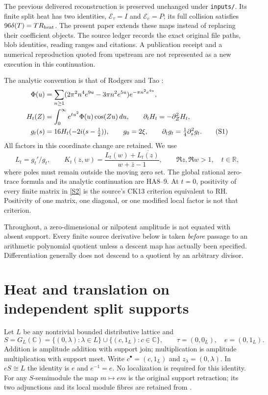 \documentclass[11pt,a4paper]{article}
\theoremstyle{definition}\newtheorem{definition}[theorem]{Definition}
\newcommand{\C}{\mathbb C}\newcommand{\R}{\mathbb R}\newcommand{\N}{\mathbb N}
\begin{document}
The previous delivered reconstruction \cite{Prior} is preserved unchanged under \texttt{inputs/}. Its finite split heat has two identities, $\mathcal E_\tau=I$ and $\mathcal E_e=P$; its full collision satisfies $96\delta(T)=TR_{\rm heat}$. The present paper extends these maps instead of replacing their coefficient objects. The source ledger records the exact original file paths, blob identities, reading ranges and citations. A publication receipt and a numerical reproduction quoted from upstream are not represented as a new execution in this continuation.

The analytic convention is that of Rodgers and Tao \cite{RT}:
\begin{align}
\Phi(u)&=\sum_{n\ge1}(2\pi^2n^4e^{9u}-3\pi n^2e^{5u})e^{-\pi n^2e^{4u}},\notag\\
H_t(Z)&=\int_0^\infty e^{tu^2}\Phi(u)\cos(Zu)\,du,\qquad
\partial_tH_t=-\partial_Z^2H_t,\notag\\
g_t(s)&=16H_t(-2i(s-\tfrac12)),\qquad g_0=2\xi,\qquad
\partial_tg_t=\tfrac14\partial_s^2g_t.\tag{S1}\label{S1}
\end{align}
All factors in this coordinate change are retained. We use
\begin{equation}
 L_t=g_t'/g_t,\qquad
 K_t(z,w)=\frac{L_t(w)+\overline{L_t(z)}}{w+\bar z-1},
 \qquad \Re z,\Re w>1,\quad t\in\R,                 \tag{S2}\label{S2}
\end{equation}
where poles must remain outside the moving zero set. The global rational zero-trace formula and its analytic continuation are HA8--9. At $t=0$, positivity of every finite matrix in \eqref{S2} is the source's CK13 criterion equivalent to RH. Positivity of one matrix, one diagonal, or one modified local factor is not that criterion.

Throughout, a zero-dimensional or nilpotent amplitude is not equated with absent support. Every finite source derivative below is taken \emph{before} passage to an arithmetic polynomial quotient unless a descent map has actually been specified. Differentiation generally does not descend to a quotient by an arbitrary divisor.

\section{Heat and translation on independent split supports}
Let $L$ be any nontrivial bounded distributive lattice and
\begin{equation}
 S=G_L(\C)=\{(0,\lambda):\lambda\in L\}
 \cup\{(c,1_L):c\in\C\},\qquad
 \tau=(0,0_L),\quad e=(0,1_L).                       \tag{ST1}
\end{equation}
Addition is amplitude addition with support join; multiplication is amplitude multiplication with support meet. Write $c^\bullet=(c,1_L)$ and $z_\lambda=(0,\lambda)$. In $eS\cong L$ the identity is $e$ and $e^{-1}=e$. No localization is required for this identity. For any $S$-semimodule the map $m\mapsto em$ is the original support retraction; its two adjunctions and its local module fibres are retained from \cite{Prior}.
\end{document}
